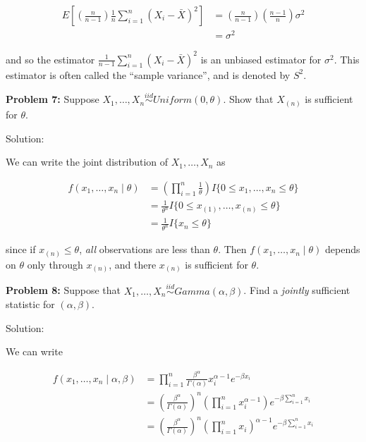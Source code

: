 \documentclass[
  letterpaper,
  DIV=11,
  numbers=noendperiod]{scrreprt}
\begin{document}
\begin{align*}
    E\left[ \left( \frac{n}{n-1} \right)\frac{1}{n} \sum_{i = 1}^n (X_i - \bar{X})^2\right] & = \left( \frac{n}{n-1} \right) \left( \frac{n-1}{n} \right) \sigma^2   \\
    & = \sigma^2
\end{align*}

and so the estimator \(\frac{1}{n-1} \sum_{i = 1}^n (X_i - \bar{X})^2\)
is an unbiased estimator for \(\sigma^2\). This estimator is often
called the ``sample variance'', and is denoted by \(S^2\).

\textbf{Problem 7:} Suppose
\(X_1, \dots, X_n \overset{iid}{\sim} Uniform(0, \theta)\). Show that
\(X_{(n)}\) is sufficient for \(\theta\).

Solution:

We can write the joint distribution of \(X_1, \dots, X_n\) as

\begin{align*}
    f(x_1, \dots, x_n \mid \theta) & = \left( \prod_{i = 1}^n \frac{1}{\theta} \right) I \{0 \leq x_1, \dots, x_n \leq \theta \} \\
    & = \frac{1}{\theta^n} I \{0 \leq x_{(1)}, \dots, x_{(n)} \leq \theta \} \\
    & = \frac{1}{\theta^n} I \{ x_{n} \leq \theta \} 
\end{align*}

since if \(x_{(n)} \leq \theta\), \emph{all} observations are less than
\(\theta\). Then \(f(x_1, \dots, x_n \mid \theta)\) depends on
\(\theta\) only through \(x_{(n)}\), and there \(x_{(n)}\) is sufficient
for \(\theta\).

\textbf{Problem 8:} Suppose that
\(X_1, \dots, X_n \overset{iid}{\sim} Gamma(\alpha, \beta)\). Find a
\emph{jointly} sufficient statistic for \((\alpha, \beta)\).

Solution:

We can write

\begin{align*}
    f(x_1, \dots, x_n \mid \alpha, \beta) & = \prod_{i = 1}^n \frac{\beta^\alpha}{\Gamma(\alpha)} x_i^{\alpha - 1} e^{-\beta x_i} \\
    & = \left( \frac{\beta^\alpha}{\Gamma(\alpha)} \right)^n \left( \prod_{i = 1}^n x_i^{\alpha - 1} \right) e^{-\beta \sum_{i = 1}^n x_i} \\
    & = \left( \frac{\beta^\alpha}{\Gamma(\alpha)} \right)^n \left( \prod_{i = 1}^n x_i \right)^{\alpha - 1}  e^{-\beta \sum_{i = 1}^n x_i}
\end{align*}
\end{document}
